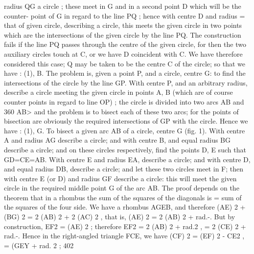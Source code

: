 \documentclass[11pt,a4paper]{book}
\begin{document}
radius QG a circle ; these meet in G and in a second point D which will be the counter- point of G in regard to the line PQ ; hence with centre D and radius = that of given circle, describing a circle, this meets the given circle in two points which are the intersections of the given circle by the line PQ. The construction fails if the line PQ passes through the centre of the given circle, for then the two auxiliary circles touch at C, or we have D coincident with C. We have therefore considered this case; Q may be taken to be the centre C of the circle; so that we have : (1), B. The problem is, given a point P, and a circle, centre G: to find the intersections of the circle by the line GP. With centre P, and an arbitrary radius, describe a circle meeting the given circle in points A, B (which are of course counter points in regard to line OP) ; the circle is divided into two arcs AB and 360 AB> and the problem is to bisect each of these two arcs; for the points of bisection are obviously the required intersections of GP with the circle. Hence we have : (1), G. To bisect a given arc AB of a circle, centre G (fig. 1). With centre A and radius AG describe a circle; and with centre B, and equal radius BG describe a circle; and on these circles respectively, find the points D, E such that GD=CE=AB. With centre E and radius EA, describe a circle; and with centre D, and equal radius DB, describe a circle; and let these two circles meet in F; then with centre E (or D) and radius GF describe a circle: this will meet the given circle in the required middle point G of the arc AB. The proof depends on the theorem that in a rhombus the sum of the squares of the diagonals is = sum of the squares of the four side. We have a rhombus AGEB, and therefore (AE) 2 + (BG) 2 = 2 (AB) 2 + 2 (AC) 2 , that is, (AE) 2 = 2 (AB) 2 + rad.-. But by construction, EF2 = (AE) 2 ; therefore EF2 = 2 (AB) 2 + rad.2 , = 2 (CE) 2 + rad.-. Hence in the right-angled triangle FCE, we have (CF) 2 = (EF) 2 - CE2 , = (GEY + rad. 2 ; 402
\end{document}
